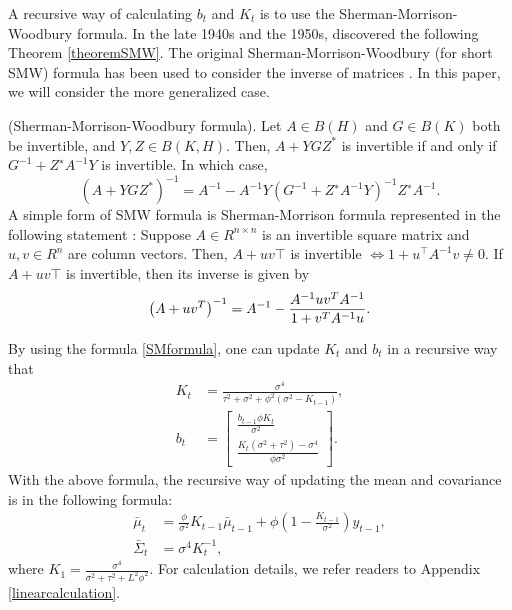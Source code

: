 A recursive way of calculating $b_t$ and $K_t$ is to use the Sherman-Morrison-Woodbury formula. In the late 1940s and the 1950s,
\cite{sherman1950adjustment, woodbury1950inverting, bartlett1951inverse, bodewig1956matrix} 
discovered the following Theorem \ref{theoremSMW}. The original Sherman-Morrison-Woodbury (for short SMW) formula has been used to consider the inverse of matrices \citep{deng2011generalization}. In this paper, we will consider the more generalized case. 
\begin{theorem}\label{theoremSMW}
(Sherman-Morrison-Woodbury formula). Let $A \in B(H)$ and $G \in B(K)$ both be invertible, and $Y, Z \in B(K, H)$. Then, $A + YGZ^*$ is invertible if and only if $G^{-1} + Z^∗A^{-1}Y$ is invertible. In which case,
\begin{equation}\label{SMWformula}
\left(A+YGZ^*\right)^{-1}= A^{-1}-A^{-1}Y\left(G^{-1}+Z^∗A^{-1}Y\right)^{-1}Z^∗A^{-1}.
\end{equation}
A simple form of SMW formula is Sherman-Morrison formula represented in the following statement \citep{bartlett1951inverse}:
Suppose $A\in R^{n\times n}$ is an invertible square matrix and $u,v\in R^n$ are column vectors. Then, $A+uv\top$ is invertible $\iff 1+u^\top A^{-1}v\neq 0$. If $A+uv\top$ is invertible, then its inverse is given by
\begin{equation}\label{SMformula}
\left(A+uv^{T}\right)^{-1}=A^{-1}-{A^{-1}uv^{T}A^{-1} \over 1+v^{T}A^{-1}u}.
\end{equation}
\end{theorem}

By using the formula \eqref{SMformula}, one can update $K_{t}$ and $b_{t}$  in a recursive way that  
\begin{align}
K_{t}  &=\frac{\sigma^4}{\tau^2+\sigma^2+\phi^2(\sigma^2-K_{t-1})},\\
b_{t} &= \begin{bmatrix}
\frac{b_{t-1}\phi K_{t}}{\sigma^2} \\ \frac{K_{t}(\sigma^2+\tau^2)-\sigma^4 }{\phi\sigma^2}
\end{bmatrix}. 
\end{align}
With the above formula, the recursive way of updating the mean and covariance is in the following formula: 
\begin{align}
\bar{\mu}_{t}       & = \frac{\phi}{\sigma^2}K_{t-1}\bar{\mu}_{t-1} + \phi \left(1 - \frac{K_{t-1}}{\sigma^2}\right)y_{t-1}, \\
\bar{\Sigma}_{t}  &= \sigma^4K_{t}^{-1},
\end{align}
where $K_1=\frac{\sigma^4}{\sigma^2+\tau^2+L^2\phi^2}$. For calculation details, we refer readers to Appendix \ref{linearcalculation}.


